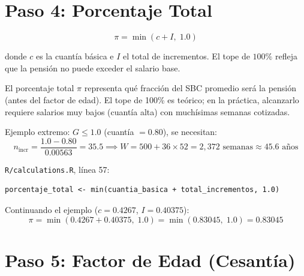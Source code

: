\documentclass[11pt,a4paper]{report}
\theoremstyle{remark}
\begin{document}
\section{Paso 4: Porcentaje Total}

\begin{tcolorbox}[colback=blue!5!white, colframe=blue!75!black, title=\textbf{Definici\'on Formal}]
\begin{equation}
\pi = \min(c + I, \; 1.0)
\label{eq:porcentaje}
\end{equation}

donde $c$ es la cuant\'ia b\'asica e $I$ el total de incrementos. El tope de $100\%$ refleja que la pensi\'on no puede exceder el salario base.
\end{tcolorbox}

\begin{tcolorbox}[colback=green!5!white, colframe=green!50!black, title=\textbf{Intuici\'on}]
El porcentaje total $\pi$ representa qu\'e fracci\'on del SBC promedio ser\'a la pensi\'on (antes del factor de edad). El tope de 100\% es te\'orico; en la pr\'actica, alcanzarlo requiere salarios muy bajos (cuant\'ia alta) con much\'isimas semanas cotizadas.

Ejemplo extremo: $G \leq 1.0$ (cuant\'ia $= 0.80$), se necesitan:
\[
n_{\text{incr}} = \frac{1.0 - 0.80}{0.00563} = 35.5 \implies W = 500 + 36 \times 52 = 2{,}372 \text{ semanas} \approx 45.6 \text{ a\~nos}
\]
\end{tcolorbox}

\begin{tcolorbox}[colback=orange!5!white, colframe=orange!75!black, title=\textbf{Aplicaci\'on en C\'odigo}]
\texttt{R/calculations.R}, l\'inea 57:
\begin{lstlisting}
porcentaje_total <- min(cuantia_basica + total_incrementos, 1.0)
\end{lstlisting}

Continuando el ejemplo ($c = 0.4267$, $I = 0.40375$):
\[
\pi = \min(0.4267 + 0.40375, \; 1.0) = \min(0.83045, \; 1.0) = 0.83045
\]
\end{tcolorbox}

\section{Paso 5: Factor de Edad (Cesant\'ia)}
\end{document}

